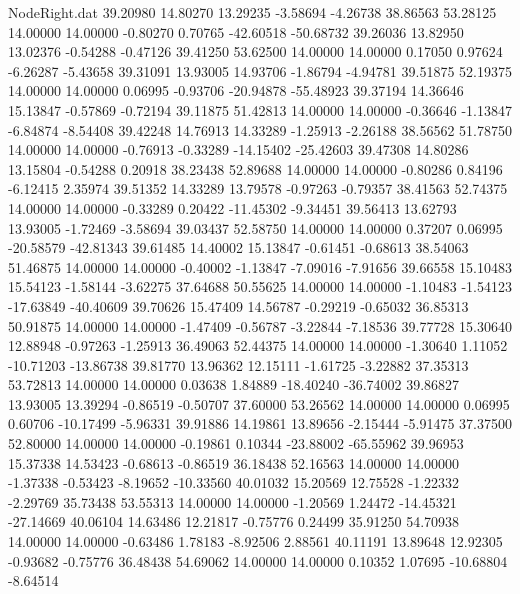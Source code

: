 \begin{filecontents}{NodeRight.dat}
  39.20980   14.80270   13.29235    -3.58694   -4.26738   38.86563   53.28125   14.00000   14.00000   -0.80270    0.70765  -42.60518  -50.68732
  39.26036   13.82950   13.02376    -0.54288   -0.47126   39.41250   53.62500   14.00000   14.00000    0.17050    0.97624   -6.26287   -5.43658
  39.31091   13.93005   14.93706    -1.86794   -4.94781   39.51875   52.19375   14.00000   14.00000    0.06995   -0.93706  -20.94878  -55.48923
  39.37194   14.36646   15.13847    -0.57869   -0.72194   39.11875   51.42813   14.00000   14.00000   -0.36646   -1.13847   -6.84874   -8.54408
  39.42248   14.76913   14.33289    -1.25913   -2.26188   38.56562   51.78750   14.00000   14.00000   -0.76913   -0.33289  -14.15402  -25.42603
  39.47308   14.80286   13.15804    -0.54288    0.20918   38.23438   52.89688   14.00000   14.00000   -0.80286    0.84196   -6.12415    2.35974
  39.51352   14.33289   13.79578    -0.97263   -0.79357   38.41563   52.74375   14.00000   14.00000   -0.33289    0.20422  -11.45302   -9.34451
  39.56413   13.62793   13.93005    -1.72469   -3.58694   39.03437   52.58750   14.00000   14.00000    0.37207    0.06995  -20.58579  -42.81343
  39.61485   14.40002   15.13847    -0.61451   -0.68613   38.54063   51.46875   14.00000   14.00000   -0.40002   -1.13847   -7.09016   -7.91656
  39.66558   15.10483   15.54123    -1.58144   -3.62275   37.64688   50.55625   14.00000   14.00000   -1.10483   -1.54123  -17.63849  -40.40609
  39.70626   15.47409   14.56787    -0.29219   -0.65032   36.85313   50.91875   14.00000   14.00000   -1.47409   -0.56787   -3.22844   -7.18536
  39.77728   15.30640   12.88948    -0.97263   -1.25913   36.49063   52.44375   14.00000   14.00000   -1.30640    1.11052  -10.71203  -13.86738
  39.81770   13.96362   12.15111    -1.61725   -3.22882   37.35313   53.72813   14.00000   14.00000    0.03638    1.84889  -18.40240  -36.74002
  39.86827   13.93005   13.39294    -0.86519   -0.50707   37.60000   53.26562   14.00000   14.00000    0.06995    0.60706  -10.17499   -5.96331
  39.91886   14.19861   13.89656    -2.15444   -5.91475   37.37500   52.80000   14.00000   14.00000   -0.19861    0.10344  -23.88002  -65.55962
  39.96953   15.37338   14.53423    -0.68613   -0.86519   36.18438   52.16563   14.00000   14.00000   -1.37338   -0.53423   -8.19652  -10.33560
  40.01032   15.20569   12.75528    -1.22332   -2.29769   35.73438   53.55313   14.00000   14.00000   -1.20569    1.24472  -14.45321  -27.14669
  40.06104   14.63486   12.21817    -0.75776    0.24499   35.91250   54.70938   14.00000   14.00000   -0.63486    1.78183   -8.92506    2.88561
  40.11191   13.89648   12.92305    -0.93682   -0.75776   36.48438   54.69062   14.00000   14.00000    0.10352    1.07695  -10.68804   -8.64514

\end{filecontents}
